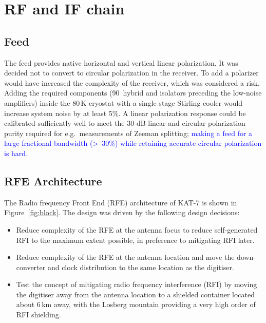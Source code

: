 \section{RF and IF chain}
\label{sec:RF}

\subsection{Feed}

\noindent
The feed provides native horizontal and vertical linear
polarization. It was decided not to convert to circular polarization
in the receiver. To add a polarizer would have increased the
complexity of the receiver, which was considered a risk. Adding the
required components (90\degr\ hybrid and isolators preceding the
low-noise amplifiers) inside the 80\,K cryostat with a single stage
Stirling cooler would increase system noise by at least 5\%.  A linear
polarization response could be calibrated sufficiently well to meet
the 30-dB linear and circular polarization purity required for
e.g.~measurements of Zeeman splitting; \textcolor{blue}{making
  a feed for a large fractional bandwidth (\textgreater~30\%) while
  retaining accurate circular polarization is hard.}

\subsection {RFE Architecture}

\noindent
The Radio frequency Front End (RFE) architecture of KAT-7 is shown in 
Figure~\ref{fig:block}.
The design was driven by the following design decisions:

\begin{itemize}
\item Reduce complexity of the RFE at the antenna focus to reduce
  self-generated RFI to the maximum extent possible, in preference to
  mitigating RFI later.
\item Reduce complexity of the RFE at the antenna location and move
  the down-converter and clock distribution to the same location as
  the digitiser.
\item Test the concept of mitigating radio frequency interference
  (RFI) by moving the digitiser away from the antenna location to a
  shielded container located about 6\,km away, with the Losberg
  mountain providing a very high order of RFI shielding.
\end{itemize}  



